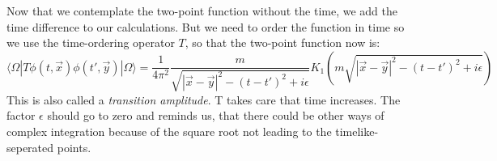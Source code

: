 	Now that we contemplate the two-point function without the time, we add the time difference to our calculations. But we need to order the function in time so we use the time-ordering operator $T$, so that the two-point function now is:
		\begin{equation}
			\langle \Omega| T \phi(t,\vec{x})\phi(t',\vec{y}) |\Omega\rangle=
			\frac{1}{4\pi^2} \frac{m}{\sqrt{|\vec{x}-\vec{y}|^2-(t-t')^2+i\epsilon}}
			K_1 \left( m\sqrt{|\vec{x}-\vec{y}|^2-(t-t')^2+i\epsilon}\right)
		\end{equation} 
	This is also called a \textit{transition amplitude}. T takes care that time increases. The factor $\epsilon$ should go to zero and reminds us, that there could be other ways of complex integration because of the square root not leading to the timelike-seperated points.